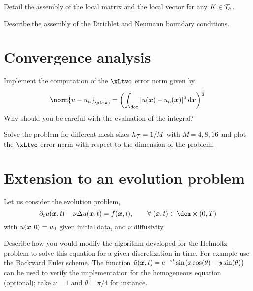 \documentclass[assignment]{tmanotes}
\begin{document}
\medskip
\begin{tmatsks}
\item Detail the assembly of the local matrix and the local vector for any $K\in{\mathcal T}_h$.
\item Describe the assembly of the Dirichlet and Neumann boundary conditions.
\end{tmatsks}

\section{Convergence analysis}

\medskip
\begin{tmatsks}
\item Implement the computation of the $\xLtwo$ error norm given by
\[
\norm{u - u_h}_{\xLtwo} = \left(\int_{\dom} |u(\xx) - u_h(\xx)|^2 \md\xx\right)^\frac{1}{2}
\]
Why should you be careful with the evaluation of the integral?
\item Solve the problem for different mesh sizes $h_{\mathcal T} = 1/M$ with $M = 4,8,16$ and plot the $\xLtwo$ error norm with respect to the dimension of the problem.
\end{tmatsks}

\section{Extension to an evolution problem}

Let us consider the evolution problem,
\begin{equation}\label{eq:heat_equation}
\partial_t u(\xx,t) - \nu\Delta u(\xx,t) = f(\xx,t), \qquad \forany (\xx,t)\in\dom\times(0,T)
\end{equation}
with $u({{\boldsymbol x}}, 0) = u_0$ given initial data, and $\nu$ diffusivity.


\medskip
\begin{tmatsks}
\item Describe how you would modify the algorithm developed for the Helmoltz problem to solve this equation for a given discretization in time. For example use the Backward Euler scheme. The function $\tilde u({{\boldsymbol x}},t) = e^{-\nu t} \sin\bigl(x \cos(\theta) + y\sin(\theta)\bigr)$ can be used to verify the implementation for the homogeneous equation (optional); take $\nu = 1$ and $\theta = \pi/4$ for instance.
\end{tmatsks}



\end{document}
